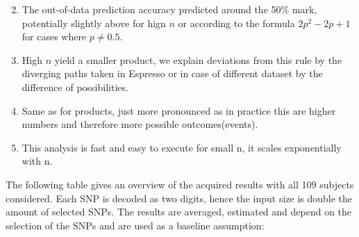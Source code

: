 \documentclass[letterpaper, 11pt]{article}
\begin{document}
\begin{enumerate} 
\setcounter{enumi}{1}
\item The out-of-data prediction accuracy predicted around the 50\% mark, potentially slightly above for hign $n$ or according to the formula $2p^2-2p+1$ for cases where $p\neq 0.5$.
\setcounter{enumi}{3}
\item High $n$ yield a smaller product, we explain deviations from this rule by the diverging paths taken in Espresso or in case of different dataset by the difference of possibilities. 
\item Same as for products, just more pronounced as in practice this are higher numbers and therefore more possible outcomes(events). 
\item This analysis is fast and easy to execute for small n, it scales exponentially with n. 
\end{enumerate}


The following table gives an overview of the acquired results with all 109 subjects considered. Each SNP is decoded as two digits, hence the input size is double the amount of selected SNPs. The results are averaged, estimated and depend on the selection of the SNPs and are used as a baseline assumption:
\end{document}
